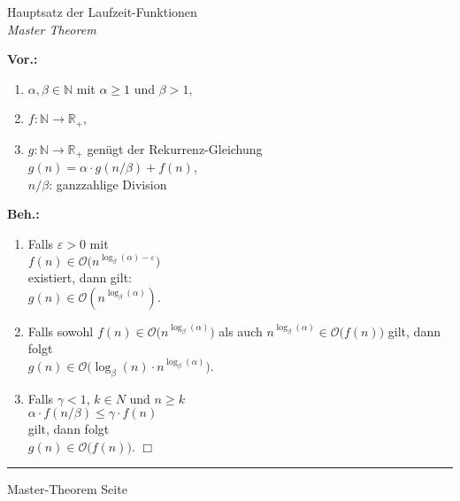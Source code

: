 \documentclass{slides}
\newcommand{\Oh}{\mathcal{O}}
\newcommand{\N}{{\mathbb N}}
\newcommand{\R}{{\mathbb R}}
\newcounter{mypage}
\begin{document}
\begin{slide}{}
\begin{center}
Hauptsatz der Laufzeit-Funktionen \\
\textsl{Master Theorem}
\end{center}

\footnotesize
\textbf{Vor.:}  
\begin{enumerate}
\item $\alpha,\beta \in \N$ mit $\alpha \geq 1$ und $\beta > 1$,
\item $f:\N \rightarrow \R_+$,
\item $g:\N \rightarrow \R_+$ gen\"ugt der Rekurrenz-Gleichung 
      \\[0.2cm]
      \hspace*{1.3cm}
      $g(n) = \alpha \cdot g\left(n/\beta\right) + f(n)$,
      \\[0.2cm]
      $\displaystyle n/\beta$: ganzzahlige Division
\end{enumerate}
\textbf{Beh.:}
\begin{enumerate}
\item Falls $\varepsilon > 0$ mit 
      \\[0.2cm]
      \hspace*{1.3cm}
      $f(n) \in \Oh\bigl(n^{\log_\beta(\alpha) - \varepsilon}\bigr)$
      \\[0.2cm]
      existiert, dann gilt: 
      \\[0.2cm]
      \hspace*{1.3cm}
      $g(n) \in \Oh\left(n^{\log_\beta(\alpha)}\right)$.
\item Falls sowohl $f(n) \in \Oh\bigl(n^{\log_\beta(\alpha)}\bigr)$ als auch 
      $n^{\log_\beta(\alpha)} \in \Oh\bigl(f(n)\bigr)$
      gilt, dann folgt
      \\[0.2cm]
      \hspace*{1.3cm}
      $g(n) \in \Oh\bigl(\log_\beta(n) \cdot n^{\log_\beta(\alpha)}\bigr)$. 
\item Falls $\gamma < 1$, $k \in N$ und $n \geq k$
      \\[0.2cm]
      \hspace*{1.3cm}
      $\alpha \cdot f\left(n/\beta\right) \leq \gamma \cdot f(n)$        
      \\[0.2cm]
      gilt, dann folgt 
      \\[0.2cm]
      \hspace*{1.3cm}
      $g(n) \in \Oh\bigl(f(n)\bigr)$. \hspace*{\fill} $\Box$
\end{enumerate}


\vspace*{\fill}
\tiny \addtocounter{mypage}{1}
\rule{17cm}{1mm}
Master-Theorem  \hspace*{\fill} Seite 
\end{slide}
\end{document}
